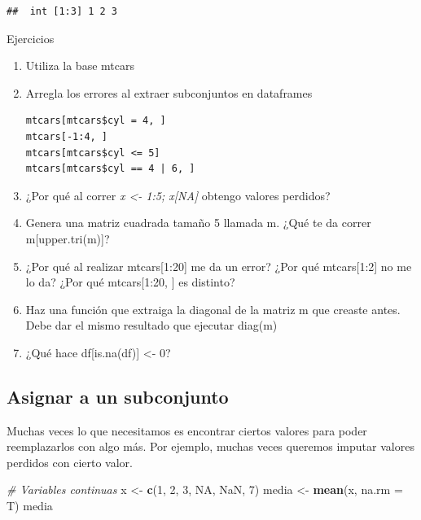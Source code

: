\documentclass[]{article}
\newenvironment{Shaded}{\begin{snugshade}}{\end{snugshade}}
\newcommand{\KeywordTok}[1]{\textcolor[rgb]{0.13,0.29,0.53}{\textbf{{#1}}}}
\newcommand{\DataTypeTok}[1]{\textcolor[rgb]{0.13,0.29,0.53}{{#1}}}
\newcommand{\DecValTok}[1]{\textcolor[rgb]{0.00,0.00,0.81}{{#1}}}
\newcommand{\StringTok}[1]{\textcolor[rgb]{0.31,0.60,0.02}{{#1}}}
\newcommand{\CommentTok}[1]{\textcolor[rgb]{0.56,0.35,0.01}{\textit{{#1}}}}
\newcommand{\OtherTok}[1]{\textcolor[rgb]{0.56,0.35,0.01}{{#1}}}
\newcommand{\NormalTok}[1]{{#1}}
\begin{document}
\begin{verbatim}
##  int [1:3] 1 2 3
\end{verbatim}

\renewcommand\bcStyleTitre[1]{\large\textcolor{bbblack}{#1}}

\begin{bclogo}[
  couleur=llred,
  arrondi=0,
  logo=\bcstop,
  barre=none,
  noborder=true]{Ejercicios}
\begin{enumerate}
\item Utiliza la base mtcars
\item{Arregla los errores al extraer subconjuntos en dataframes
\begin{verbatim}
mtcars[mtcars$cyl = 4, ]
mtcars[-1:4, ]
mtcars[mtcars$cyl <= 5]
mtcars[mtcars$cyl == 4 | 6, ]
\end{verbatim}
}
\item ¿Por qué al correr {\it x <- 1:5; x[NA] } obtengo valores perdidos?
\item Genera una matriz cuadrada tamaño 5 llamada m. ¿Qué te da correr m[upper.tri(m)]?
\item ¿Por qué al realizar mtcars[1:20] me da un error? ¿Por qué mtcars[1:2] no me lo da?
¿Por qué mtcars[1:20, ] es distinto?
\item Haz una función que extraiga la diagonal de la matriz m que creaste antes.
Debe dar el mismo resultado que ejecutar diag(m)
\item ¿Qué hace df[is.na(df)] <- 0?
\end{enumerate}
\end{bclogo}

\subsection{Asignar a un subconjunto}\label{asignar-a-un-subconjunto}

Muchas veces lo que necesitamos es encontrar ciertos valores para poder
reemplazarlos con algo más. Por ejemplo, muchas veces queremos imputar
valores perdidos con cierto valor.

\begin{Shaded}
\begin{Highlighting}[]
\CommentTok{# Variables continuas}
\NormalTok{x <-}\StringTok{ }\KeywordTok{c}\NormalTok{(}\DecValTok{1}\NormalTok{, }\DecValTok{2}\NormalTok{, }\DecValTok{3}\NormalTok{, }\OtherTok{NA}\NormalTok{, }\OtherTok{NaN}\NormalTok{, }\DecValTok{7}\NormalTok{)}
\NormalTok{media <-}\StringTok{ }\KeywordTok{mean}\NormalTok{(x, }\DataTypeTok{na.rm =} \NormalTok{T)}
\NormalTok{media}
\end{Highlighting}
\end{Shaded}
\end{document}
